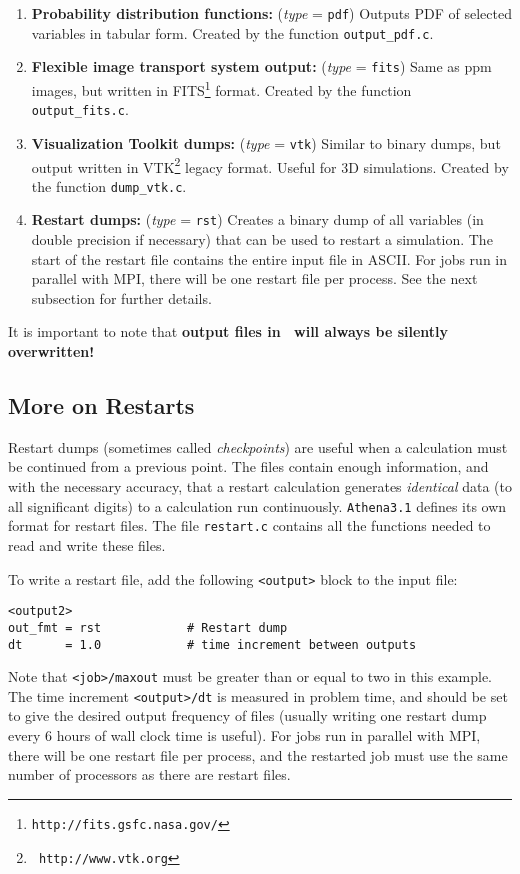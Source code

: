 \begin{enumerate}
\item {\bf Probability distribution functions:} ({\em type} = {\tt pdf})
Outputs PDF of selected variables in tabular form.  Created by the
function {\tt output\_pdf.c}.

\item {\bf Flexible image transport system output:} ({\em type} = {\tt fits}) Same as ppm images,
but written in FITS\footnote{{\tt http://fits.gsfc.nasa.gov/}} format.
Created by the function {\tt output\_fits.c}.

\item {\bf Visualization Toolkit dumps:} ({\em type} = {\tt vtk})
Similar to binary dumps, but output written in VTK\footnote{\tt
http://www.vtk.org} legacy format.  Useful for 3D simulations.  Created by
the function {\tt dump\_vtk.c}.

\item {\bf Restart dumps:} ({\em type} = {\tt rst}) Creates a binary dump
of all variables (in double precision if necessary) that can be used to
restart a simulation.  The start of the restart file contains the entire
input file in ASCII.  For jobs run in parallel with MPI, there will be
one restart file per process.
See the next subsection for further details.

\end{enumerate}

\noindent
It is important to note that {\bf output files in \ath\ will always be
silently overwritten!} 

\subsection{More on Restarts}

Restart dumps (sometimes called {\em checkpoints}) are useful when a 
calculation must be continued from a previous point.  The files contain
enough information, and with the necessary accuracy, that a restart calculation
generates {\em identical} data (to all significant digits) to a calculation run
continuously.  {\tt Athena3.1} defines its
own format for restart files.  The file {\tt restart.c} contains all
the functions needed to read and write these files.

To write a restart file, add the following {\tt <output>} block to the
input file:
\begin{verbatim}
<output2>
out_fmt = rst            # Restart dump
dt      = 1.0            # time increment between outputs
\end{verbatim}
Note that {\tt <job>/maxout} must be greater than or equal to two in this
example.  The time increment {\tt <output>/dt} is measured in problem time, 
and should be set to give the desired output frequency of files
(usually writing one restart dump every 6 hours of wall clock time is useful).
For jobs run in parallel with MPI, there will be one restart file per process,
and the restarted job must use the same number of processors as there are
restart files.

